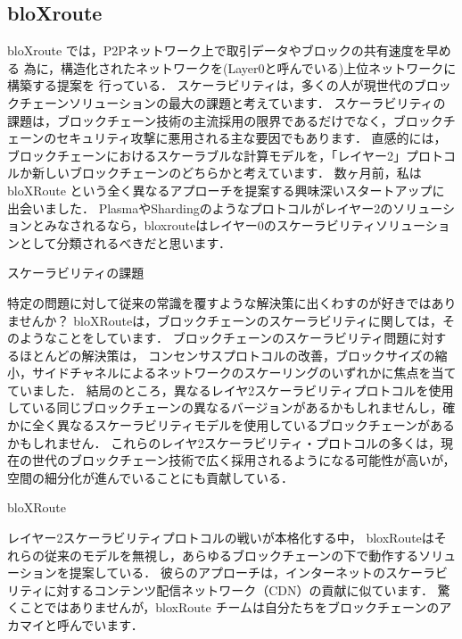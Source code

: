 \documentclass[a4paper,12pt]{jsarticle}
\begin{document}
      \subsection{bloXroute}
bloXroute \cite{bloX} では，P2Pネットワーク上で取引データやブロックの共有速度を早める
為に，構造化されたネットワークを(Layer0と呼んでいる)上位ネットワークに構築する提案を
行っている．
スケーラビリティは，多くの人が現世代のブロックチェーンソリューションの最大の課題と考えています．
スケーラビリティの課題は，ブロックチェーン技術の主流採用の限界であるだけでなく，ブロックチェーンのセキュリティ攻撃に悪用される主な要因でもあります．
直感的には，ブロックチェーンにおけるスケーラブルな計算モデルを，「レイヤー2」プロトコルか新しいブロックチェーンのどちらかと考えています．
数ヶ月前，私は bloXRoute という全く異なるアプローチを提案する興味深いスタートアップに出会いました．
PlasmaやShardingのようなプロトコルがレイヤー2のソリューションとみなされるなら，bloxrouteはレイヤー0のスケーラビリティソリューションとして分類されるべきだと思います．

スケーラビリティの課題

特定の問題に対して従来の常識を覆すような解決策に出くわすのが好きではありませんか？
bloXRouteは，ブロックチェーンのスケーラビリティに関しては，そのようなことをしています．
ブロックチェーンのスケーラビリティ問題に対するほとんどの解決策は，
コンセンサスプロトコルの改善，ブロックサイズの縮小，サイドチャネルによるネットワークのスケーリングのいずれかに焦点を当てていました．
結局のところ，異なるレイヤ2スケーラビリティプロトコルを使用している同じブロックチェーンの異なるバージョンがあるかもしれませんし，確かに全く異なるスケーラビリティモデルを使用しているブロックチェーンがあるかもしれません．
これらのレイヤ2スケーラビリティ・プロトコルの多くは，現在の世代のブロックチェーン技術で広く採用されるようになる可能性が高いが，空間の細分化が進んでいることにも貢献している．

bloXRoute

レイヤー2スケーラビリティプロトコルの戦いが本格化する中，
bloxRouteはそれらの従来のモデルを無視し，あらゆるブロックチェーンの下で動作するソリューションを提案している．
彼らのアプローチは，インターネットのスケーラビリティに対するコンテンツ配信ネットワーク（CDN）の貢献に似ています．
驚くことではありませんが，bloxRoute チームは自分たちをブロックチェーンのアカマイと呼んでいます．
\end{document}
